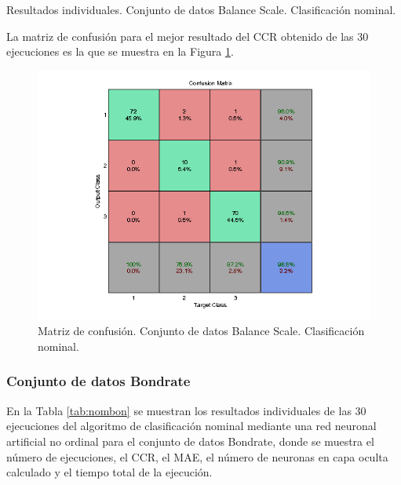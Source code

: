 			\begin{table}[!htbp]
				\centering
				\caption{Resultados individuales. Conjunto de datos Balance Scale. Clasificación nominal.}
				\label{tab:nombal}
			\end{table}
			
			La matriz de confusión para el mejor resultado del CCR obtenido de las 30 ejecuciones es la que se muestra en la Figura \ref{fig:nombal}.
			
			\begin{figure}[htbp]
				\centering
				\includegraphics[scale=0.8]{../src/results/nominal/balance_mc6.png}
				\caption{Matriz de confusión. Conjunto de datos Balance Scale. Clasificación nominal.}
				\label{fig:nombal}
			\end{figure}
			
			\subsubsection{Conjunto de datos Bondrate}
			
			En la Tabla \ref{tab:nombon} se muestran los resultados individuales de las 30 ejecuciones del algoritmo de clasificación nominal mediante una red neuronal artificial no ordinal para el conjunto de datos Bondrate, donde se muestra el número de ejecuciones, el CCR, el MAE, el número de neuronas en capa oculta calculado y el tiempo total de la ejecución.\\
			
